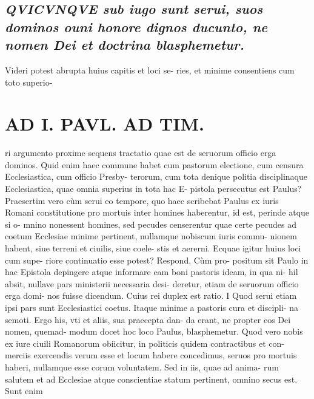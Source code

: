 \documentclass{article}
\begin{document}
\begin{pages}
\subsection*{\textit{\huge\textbf{Q}\normalsize VICVNQVE sub iugo sunt serui, suos dominos ouni honore dignos ducunto, ne nomen Dei et doctrina blasphemetur. }}\pstart Videri potest abrupta huius capitis et loci se- ries, et minime consentiens cum toto superio-  \pend
{}
{}
\subsection*{\textit{}}
\section*{AD I. PAVL. AD TIM. }
\marginpar{[ p.410 ]}\pstart ri argumento proxime sequens tractatio quae est de seruorum officio erga dominos. Quid enim haec commune habet cum pastorum electione, cum censura Ecclesiastica, cum officio Presby- terorum, cum tota denique politia disciplinaque Ecclesiastica, quae omnia superius in tota hac E- pistola persecutus est Paulus? Praesertim vero cùm serui eo tempore, quo haec scribebat Paulus ex iuris Romani constitutione pro mortuis inter homines haberentur, id est, perinde atque si o- mnino nonessent homines, sed pecudes censerentur quae certe pecudes ad coetum Ecclesiae minime pertinent, nullamque nobiscum iuris commu- nionem habent, siue terreni et ciuilis, siue coele- stis et aererni. Ecquae igitur huius loci cum supe- riore continuatio esse potest? Respond. Cùm pro- positum sit Paulo in hac Epistola depingere atque  informare eam boni pastoris ideam, in qua ni- hil absit, nullave pars ministerii necessaria desi- deretur, etiam de seruorum officio erga domi- nos fuisse dicendum. Cuius rei duplex est ratio.  \pend\pstart I Quod serui etiam ipsi pars sunt Ecclesiastici coetus. Itaque minime a pastoris cura et discipli- na semoti. Ergo his, vti et aliis, sua praecepta dan- da erant, ne propter eos Dei nomen, quemad- modum docet hoc loco Paulus, blasphemetur. Quod vero nobis ex iure ciuili Romanorum obiicitur, in politicis quidem contractibus et con- merciis exercendis verum esse et locum habere concedimus, seruos pro mortuis haberi, nullamque  esse corum voluntatem. Sed in iis, quae ad anima- rum salutem et ad Ecclesiae atque conscientiae statum pertinent, omnino secus est. Sunt enim  \pend

\end{pages}
\end{document}
